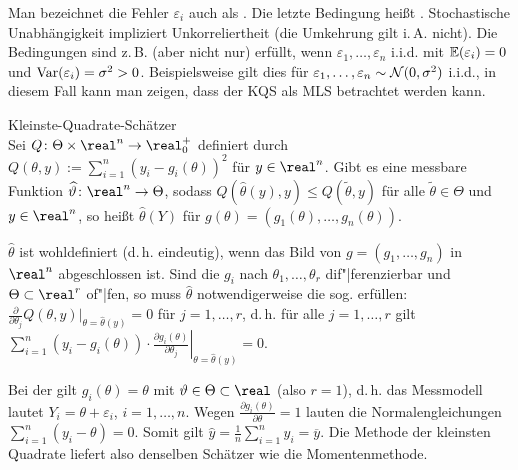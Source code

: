 \begin{Bem}
    Man bezeichnet die Fehler $\varepsilon_i$ auch als .
    Die letzte Bedingung heißt .
    Stochastische Unabhängigkeit impliziert Unkorreliertheit (die Umkehrung gilt i.\,A. nicht).
    Die Bedingungen sind z.\,B. (aber nicht nur) erfüllt, wenn
    $\varepsilon_1, \dotsc, \varepsilon_n$ i.i.d. mit $\mathbb{E}(\varepsilon_i) = 0$ und
    $\mathrm{Var}(\varepsilon_i) = \sigma^2 > 0$.
    Beispielsweise gilt dies für $\varepsilon_1, \dotsc, \varepsilon_n \sim \mathcal{N}(0, \sigma^2)$
    i.i.d., in diesem Fall kann man zeigen, dass der KQS als MLS betrachtet werden kann.
\end{Bem}

\linie

\begin{Def}{Kleinste-Quadrate-Schätzer}\\
    Sei $Q\colon \Theta \times \real^n \rightarrow \real_0^+$ definiert durch
    $Q(\theta, y) := \sum_{i=1}^n (y_i - g_i(\theta))^2$ für $y \in \real^n$.
    Gibt es eine messbare Funktion $\widehat{\theta}\colon \real^n \rightarrow \Theta$,
    sodass $Q(\widehat{\theta}(y), y) \le Q(\widetilde{\theta}, y)$ für alle
    $\widetilde{\theta} \in \Theta$ und $y \in \real^n$,
    so heißt $\widehat{\theta}(Y)$   für
    $g(\theta) = (g_1(\theta), \dotsc, g_n(\theta))$.
\end{Def}

\begin{Bem}
    $\widehat{\theta}$ ist wohldefiniert (d.\,h. eindeutig),
    wenn das Bild von $g = (g_1, \dotsc, g_n)$ in $\real^n$ abgeschlossen ist.
    Sind die $g_i$ nach $\theta_1, \dotsc, \theta_r$ dif"|ferenzierbar und $\Theta \subset \real^r$
    of"|fen, so muss $\widehat{\theta}$ notwendigerweise die sog.
     erfüllen:
    $\frac{\partial}{\partial \theta_j} Q(\theta, y)|_{\theta=\widehat{\theta}(y)} = 0$ für
    $j = 1, \dotsc, r$, d.\,h. für alle $j = 1, \dotsc, r$ gilt
    $\sum_{i=1}^n (y_i - g_i(\theta)) \cdot
    \left.\frac{\partial g_i(\theta)}{\partial \theta_j}\right|_{\theta=\widehat{\theta}(y)} = 0$.
\end{Bem}

\linie
\pagebreak

\begin{Bsp}
    Bei der  gilt $g_i(\theta) = \theta$ mit
    $\theta \in \Theta \subset \real$ (also $r = 1$), d.\,h. das Messmodell lautet
    $Y_i = \theta + \varepsilon_i$, $i = 1, \dotsc, n$.
    Wegen $\frac{\partial g_i(\theta)}{\partial \theta} = 1$ lauten die Normalengleichungen
    $\sum_{i=1}^n (y_i - \theta) = 0$.
    Somit gilt $\widehat{y} = \frac{1}{n} \sum_{i=1}^n y_i = \overline{y}$.
    Die Methode der kleinsten Quadrate liefert also denselben Schätzer wie die Momentenmethode.
\end{Bsp}


